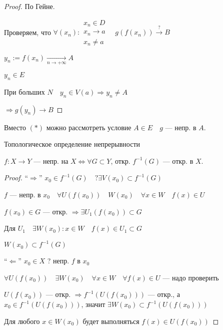     \begin{proof}
        По Гейне.

        Проверяем, что $\forall (x_n): \substack{x_n\in D \\ x_n\to a \\ x_n\not=a} \quad g(f(x_n))\xrightarrow{?} B$

        $y_n:=f(x_n)\xrightarrow[n\to+\infty]{} A$

        $y_n\in E$

        При больших $N\quad y_n\in V(a) \Rightarrow y_n\not=A$

        $\Rightarrow g(y_n)\to B$
    \end{proof}
    \begin{remark}
        Вместо $(*)$ можно рассмотреть условие $A\in E \quad g$ --- непр. в $A$.
    \end{remark}
    \begin{theorem}
        Топологическое определение непрерывности

        $f: X\to Y$ --- непр. на $X \Leftrightarrow \forall G\subset Y$, откр. $f^{-1}(G)$ --- откр. в $X$.
    \end{theorem}
    \begin{proof}
        ``$\Rightarrow$'' $x_0\in f^{-1}(G) \quad ?\exists V(x_0)\subset f^{-1}(G)$

        $f$ --- непр. в $x_0 \quad \forall U(f(x_0)) \quad W(x_0) \quad \forall x\in W \quad f(x)\in U$

        $f(x_0)\in G$ --- откр. $\Rightarrow \exists U_1(f(x_0))\subset G$

        Для $U_1 \quad \exists W(x_0):x\in W \quad f(x)\in U_1\subset G$

        $W(x_0)\subset f^{-1}(G)$

        ``$\Leftarrow$'' $x_0\in X$ ? непр. $f$ в $x_0$

        $\forall U(f(x_0)) \quad \exists W(x_0) \quad \forall x\in W \quad \forall f(x)\in U$ --- надо проверить

        $U(f(x_0))$ --- откр. $\Rightarrow f^{-1}(U(f(x_0)))$ --- откр., а $x_0\in f^{-1}(U(f(x_0)))$, значит $\exists W(x_0) \subset f^{-1}(U(f(x_0)))$

        Для любого $x\in W(x_0)$ будет выполняться $f(x)\in U(f(x_0))$
    \end{proof}
